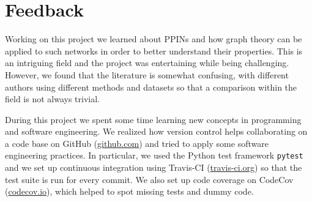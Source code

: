 \documentclass[9pt,onecolumn,twoside]{pnas-new}
\begin{document}
\showmatmethods %


\showacknow %

\section*{Feedback}
Working on this project we learned about PPINs and how graph theory can be applied to such networks in order to better understand their properties. This is an intriguing field and the project was entertaining while being challenging. However, we found that the literature is somewhat confusing, with different authors using different methods and datasets so that a comparison within the field is not always trivial.

During this project we spent some time learning new concepts in programming and software engineering. We realized how version control helps collaborating on a code base on GitHub (\url{github.com}) and tried to apply some software engineering practices. In particular, we used the Python test framework \texttt{pytest} and we set up continuous integration using Travis-CI (\url{travis-ci.org}) so that the test suite is run for every commit. We also set up code coverage on CodeCov (\url{codecov.io}), which helped to spot missing tests and dummy code.


\pnasbreak


\end{document}
